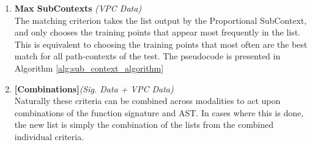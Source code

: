 \begin{enumerate}
    \item\textbf{Max SubContexts} \textit{(VPC Data)}\\The matching criterion takes the list output by the Proportional SubContext, and only chooses the training points that appear most frequently in the list. This is equivalent to choosing the training points that most often are the best match for all path-contexts of the test. The pseudocode is presented in Algorithm \ref{alg:sub_context_algorithm} 
    \item\textbf{[Combinations]}\textit{(Sig. Data + VPC Data)} \\ Naturally these criteria can be combined across modalities to act upon combinations of the function signature and AST. In cases where this is done, the new list is simply the combination of the lists from the combined individual criteria. 
\end{enumerate}









\begin{table}[h!]

    \caption{An Summary of the BestMatchingSet algorithms we use in the experiments. For sake of simplicity, a \textit{best-effort} match here refers to the match with longest matching subsequence, when treating a VPC as one long sequence}
    \label{tab:matching_summary}
\end{table}





